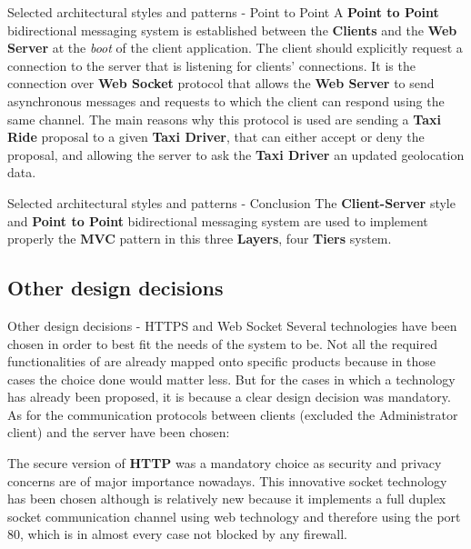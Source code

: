 \documentclass{../common/latex_classes/pdf_presentation}
\begin{document}
	\begin{frame}{Selected architectural styles and patterns - Point to Point}
		A \textbf{Point to Point} bidirectional messaging system is established between the \textbf{Clients} and the \textbf{Web Server} at the \textit{boot} of the client application.
		The client should explicitly request a connection to the server that is listening for clients' connections.
		It is the connection over \textbf{Web Socket} protocol that allows the \textbf{Web Server} to send asynchronous messages and requests to which the client can respond using the same channel.
		The main reasons why this protocol is used are sending a \textbf{Taxi Ride} proposal to a given \textbf{Taxi Driver}, that can either accept or deny the proposal, and allowing the server to ask the \textbf{Taxi Driver} an updated geolocation data.
	\end{frame}
	
	\begin{frame}{Selected architectural styles and patterns - Conclusion}
		The \textbf{Client-Server} style and \textbf{Point to Point} bidirectional messaging system are used to implement properly the \textbf{MVC} pattern in this three \textbf{Layers}, four \textbf{Tiers} system.
	\end{frame}
	
	\subsection{Other design decisions}
		
	\begin{frame}{Other design decisions - HTTPS and Web Socket}
		Several technologies have been chosen in order to best fit the needs of the system to be.
		Not all the required functionalities of \myTaxiService{} are already mapped onto specific products because in those cases the choice done would matter less.
		But for the cases in which a technology has already been proposed, it is because a clear design decision was mandatory.
		As for the communication protocols between clients (excluded the Administrator client) and the server have been chosen:
		\begin{itemize}
			 The secure version of \textbf{HTTP} was a mandatory choice as security and privacy concerns are of major importance nowadays.
			 This innovative socket technology has been chosen although is relatively new because it implements a full duplex socket communication channel using web technology and therefore using the port 80, which is in almost every case not blocked by any firewall.
		\end{itemize}
	\end{frame}
	
\end{document}
